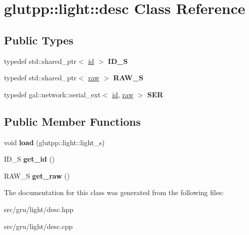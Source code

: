 \hypertarget{classglutpp_1_1light_1_1desc}{\section{glutpp\-:\-:light\-:\-:desc \-Class \-Reference}
\label{classglutpp_1_1light_1_1desc}
}
\subsection*{\-Public \-Types}
\begin{DoxyCompactItemize}
\item 
\hypertarget{classglutpp_1_1light_1_1desc_a5a3ba7e7c2f64d1f62b64e6728688a49}{typedef std\-::shared\-\_\-ptr$<$ \hyperlink{classglutpp_1_1light_1_1id}{id} $>$ {\bfseries \-I\-D\-\_\-\-S}}\label{classglutpp_1_1light_1_1desc_a5a3ba7e7c2f64d1f62b64e6728688a49}

\item 
\hypertarget{classglutpp_1_1light_1_1desc_a7e1d1706bb05d66ace94342d0b281ac9}{typedef std\-::shared\-\_\-ptr$<$ \hyperlink{classglutpp_1_1light_1_1raw}{raw} $>$ {\bfseries \-R\-A\-W\-\_\-\-S}}\label{classglutpp_1_1light_1_1desc_a7e1d1706bb05d66ace94342d0b281ac9}

\item 
\hypertarget{classglutpp_1_1light_1_1desc_a361129092ae637f8218fd0228c8b03e1}{typedef \*
gal\-::network\-::serial\-\_\-ext$<$ \hyperlink{classglutpp_1_1light_1_1id}{id}, \*
\hyperlink{classglutpp_1_1light_1_1raw}{raw} $>$ {\bfseries \-S\-E\-R}}\label{classglutpp_1_1light_1_1desc_a361129092ae637f8218fd0228c8b03e1}

\end{DoxyCompactItemize}
\subsection*{\-Public \-Member \-Functions}
\begin{DoxyCompactItemize}
\item 
\hypertarget{classglutpp_1_1light_1_1desc_a4da8561e1313aa9fc72a30bae278faa5}{void {\bfseries load} (glutpp\-::light\-::light\-\_\-s)}\label{classglutpp_1_1light_1_1desc_a4da8561e1313aa9fc72a30bae278faa5}

\item 
\hypertarget{classglutpp_1_1light_1_1desc_a15262f1b1025ae0f3e5c2b6e074befc5}{\-I\-D\-\_\-\-S {\bfseries get\-\_\-id} ()}\label{classglutpp_1_1light_1_1desc_a15262f1b1025ae0f3e5c2b6e074befc5}

\item 
\hypertarget{classglutpp_1_1light_1_1desc_a349979ba9075fe1c876c97cde3ef60bc}{\-R\-A\-W\-\_\-\-S {\bfseries get\-\_\-raw} ()}\label{classglutpp_1_1light_1_1desc_a349979ba9075fe1c876c97cde3ef60bc}

\end{DoxyCompactItemize}


\-The documentation for this class was generated from the following files\-:\begin{DoxyCompactItemize}
\item 
src/gru/light/desc.\-hpp\item 
src/gru/light/desc.\-cpp\end{DoxyCompactItemize}
